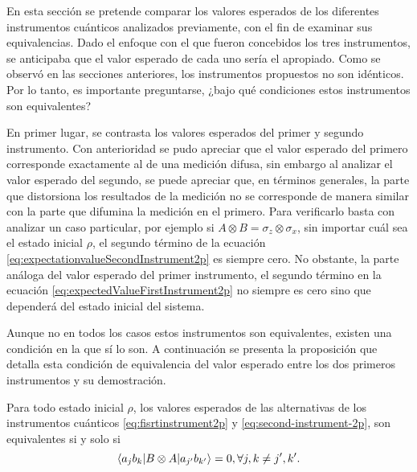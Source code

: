 En esta sección se pretende comparar los valores esperados de los diferentes
instrumentos cuánticos analizados previamente, con el fin de examinar sus
equivalencias.  Dado el enfoque con el que fueron concebidos los tres
instrumentos, se anticipaba que el valor esperado de cada uno sería el
apropiado. Como se observó en las secciones anteriores, los instrumentos
propuestos no son idénticos. Por lo tanto, es importante preguntarse, ¿bajo qué
condiciones estos instrumentos son equivalentes?



En primer lugar, se contrasta los valores esperados del primer y segundo
instrumento. Con anterioridad se pudo apreciar que el valor esperado del
primero corresponde exactamente al de una medición difusa, sin embargo al
analizar el valor esperado del segundo, se puede apreciar que, en términos
generales, la parte que distorsiona los resultados de la medición no se
corresponde de manera similar con la parte que difumina la medición en el
primero. Para verificarlo basta con analizar un caso particular, por ejemplo si
$A\otimes B= \sigma_z\otimes \sigma_x$, sin importar cuál sea el estado inicial
$\rho$, el segundo término de  la ecuación
{\eqref{eq:expectationvalueSecondInstrument2p}} es siempre cero. No obstante,
la parte análoga del valor esperado del primer instrumento, el segundo término
en la ecuación {\eqref{eq:expectedValueFirstInstrument2p}} no siempre es cero
sino que dependerá del estado inicial del sistema.  


Aunque no en todos los casos estos instrumentos son equivalentes, existen una
condición en la que sí lo son. A continuación se presenta la proposición que
detalla esta condición de equivalencia del valor esperado entre los dos
primeros instrumentos y su demostración.


\begin{proposition}\label{prop:Equivalencia-instruments1-2}
    Para todo estado inicial $\rho$, los valores esperados de las alternativas
de los instrumentos cuánticos {\eqref{eq:fisrtinstrument2p}} y
{\eqref{eq:second-instrument-2p}}, son equivalentes si y solo si \[\langle a_j
b_k|B\otimes A|a_{j'}b_{k'}\rangle=0, \forall j,k\ne j',k'.\]
\end{proposition}

